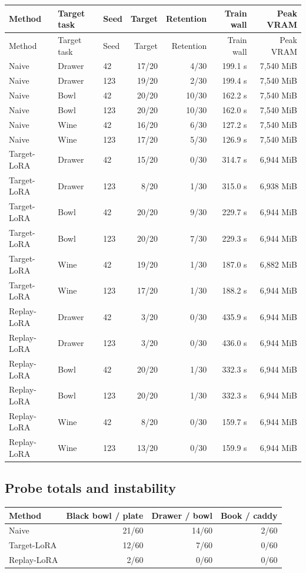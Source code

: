 \documentclass[9pt]{extarticle}
\begin{document}
\begin{longtable}{@{}lllrrrr@{}}
\toprule
Method & Target task & Seed & Target & Retention & Train wall & Peak VRAM\\
\midrule
\endfirsthead
\toprule
Method & Target task & Seed & Target & Retention & Train wall & Peak VRAM\\
\midrule
\endhead
Naive & Drawer & 42 & 17/20 & 4/30 & 199.1 s & 7,540 MiB\\
Naive & Drawer & 123 & 19/20 & 2/30 & 199.4 s & 7,540 MiB\\
Naive & Bowl & 42 & 20/20 & 10/30 & 162.2 s & 7,540 MiB\\
Naive & Bowl & 123 & 20/20 & 10/30 & 162.0 s & 7,540 MiB\\
Naive & Wine & 42 & 16/20 & 6/30 & 127.2 s & 7,540 MiB\\
Naive & Wine & 123 & 17/20 & 5/30 & 126.9 s & 7,540 MiB\\
\midrule
Target-LoRA & Drawer & 42 & 15/20 & 0/30 & 314.7 s & 6,944 MiB\\
Target-LoRA & Drawer & 123 & 8/20 & 1/30 & 315.0 s & 6,938 MiB\\
Target-LoRA & Bowl & 42 & 20/20 & 9/30 & 229.7 s & 6,944 MiB\\
Target-LoRA & Bowl & 123 & 20/20 & 7/30 & 229.3 s & 6,944 MiB\\
Target-LoRA & Wine & 42 & 19/20 & 1/30 & 187.0 s & 6,882 MiB\\
Target-LoRA & Wine & 123 & 17/20 & 1/30 & 188.2 s & 6,944 MiB\\
\midrule
Replay-LoRA & Drawer & 42 & 3/20 & 0/30 & 435.9 s & 6,944 MiB\\
Replay-LoRA & Drawer & 123 & 3/20 & 0/30 & 436.0 s & 6,944 MiB\\
Replay-LoRA & Bowl & 42 & 20/20 & 1/30 & 332.3 s & 6,944 MiB\\
Replay-LoRA & Bowl & 123 & 20/20 & 1/30 & 332.3 s & 6,944 MiB\\
Replay-LoRA & Wine & 42 & 8/20 & 0/30 & 159.7 s & 6,944 MiB\\
Replay-LoRA & Wine & 123 & 13/20 & 0/30 & 159.9 s & 6,944 MiB\\
\bottomrule
\end{longtable}

\subsection{Probe totals and instability}

\begin{center}
\begin{tabular}{@{}lrrr@{}}
\toprule
Method & Black bowl / plate & Drawer / bowl & Book / caddy\\
\midrule
Naive & 21/60 & 14/60 & 2/60\\
Target-LoRA & 12/60 & 7/60 & 0/60\\
Replay-LoRA & 2/60 & 0/60 & 0/60\\
\bottomrule
\end{tabular}
\end{center}
\end{document}
